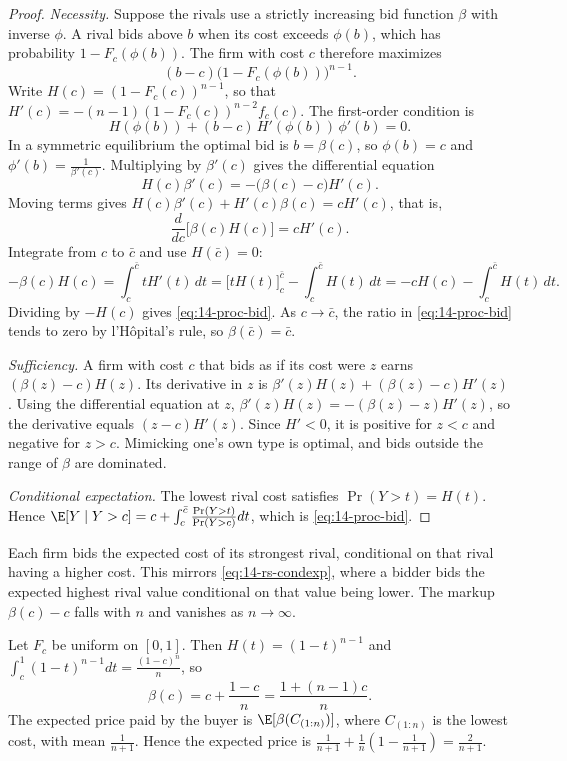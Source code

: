 \begin{proof}
\emph{Necessity.} Suppose the rivals use a strictly increasing bid function $\beta$ with inverse
$\phi$. A rival bids above $b$ when its cost exceeds $\phi(b)$, which has probability
$1-F_c(\phi(b))$. The firm with cost $c$ therefore maximizes
\[
(b-c)\bigl(1-F_c(\phi(b))\bigr)^{n-1}.
\]
Write $H(c)=(1-F_c(c))^{n-1}$, so that $H'(c)=-(n-1)(1-F_c(c))^{n-2}f_c(c)$. The first-order
condition is
\[
H(\phi(b))+(b-c)\,H'(\phi(b))\,\phi'(b)=0 .
\]
In a symmetric equilibrium the optimal bid is $b=\beta(c)$, so $\phi(b)=c$ and
$\phi'(b)=\frac{1}{\beta'(c)}$. Multiplying by $\beta'(c)$ gives the differential equation
\[
H(c)\beta'(c)=-\bigl(\beta(c)-c\bigr)H'(c).
\]
Moving terms gives $H(c)\beta'(c)+H'(c)\beta(c)=cH'(c)$, that is,
\[
\frac{d}{dc}\bigl[\beta(c)H(c)\bigr]=cH'(c).
\]
Integrate from $c$ to $\bar c$ and use $H(\bar c)=0$:
\[
-\beta(c)H(c)=\int_c^{\bar c}tH'(t)\,dt=\bigl[tH(t)\bigr]_c^{\bar c}-\int_c^{\bar c}H(t)\,dt=-cH(c)-\int_c^{\bar c}H(t)\,dt .
\]
Dividing by $-H(c)$ gives \eqref{eq:14-proc-bid}. As $c\to\bar c$, the ratio in
\eqref{eq:14-proc-bid} tends to zero by l'H\^opital's rule, so $\beta(\bar c)=\bar c$.

\emph{Sufficiency.} A firm with cost $c$ that bids as if its cost were $z$ earns $(\beta(z)-c)H(z)$.
Its derivative in $z$ is $\beta'(z)H(z)+(\beta(z)-c)H'(z)$. Using the differential equation at $z$,
$\beta'(z)H(z)=-(\beta(z)-z)H'(z)$, so the derivative equals $(z-c)H'(z)$. Since $H'<0$, it is
positive for $z<c$ and negative for $z>c$. Mimicking one's own type is optimal, and bids outside the
range of $\beta$ are dominated.

\emph{Conditional expectation.} The lowest rival cost satisfies $\Pr(Y>t)=H(t)$. Hence
$\E[Y\mid Y>c]=c+\int_c^{\bar c}\frac{\Pr(Y>t)}{\Pr(Y>c)}dt$, which is \eqref{eq:14-proc-bid}.
\end{proof}

Each firm bids the expected cost of its strongest rival, conditional on that rival having a higher
cost. This mirrors \eqref{eq:14-rs-condexp}, where a bidder bids the expected highest rival value
conditional on that value being lower. The markup $\beta(c)-c$ falls with $n$ and vanishes as
$n\to\infty$.

\begin{example}\label{ex:14-proc-uniform}
Let $F_c$ be uniform on $[0,1]$. Then $H(t)=(1-t)^{n-1}$ and $\int_c^1(1-t)^{n-1}dt=\frac{(1-c)^n}{n}$,
so
\begin{equation}\label{eq:14-proc-uniform}
\beta(c)=c+\frac{1-c}{n}=\frac{1+(n-1)c}{n}.
\end{equation}
The expected price paid by the buyer is $\E[\beta(C_{(1:n)})]$, where $C_{(1:n)}$ is the lowest cost,
with mean $\frac{1}{n+1}$. Hence the expected price is
$\frac{1}{n+1}+\frac{1}{n}\left(1-\frac{1}{n+1}\right)=\frac{2}{n+1}$.
\end{example}

